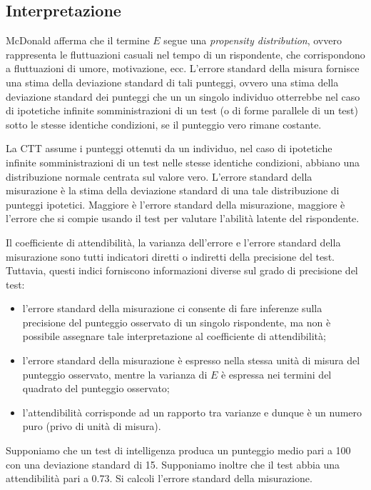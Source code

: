 \documentclass[
  11pt,
]{krantz}
\providecommand{\tightlist}{%
  \setlength{\itemsep}{0pt}\setlength{\parskip}{0pt}}
\theoremstyle{definition}
\theoremstyle{definition}
\theoremstyle{definition}
\theoremstyle{definition}
\theoremstyle{remark}
\begin{document}
\hypertarget{interpretazione}{%
\subsection{Interpretazione}\label{interpretazione}}

McDonald afferma che il termine \(E\) segue una \emph{propensity distribution}, ovvero rappresenta le fluttuazioni casuali nel tempo di un rispondente, che corrispondono a fluttuazioni di umore, motivazione, ecc. L'errore standard della misura fornisce una stima della deviazione standard di tali punteggi, ovvero una stima della deviazione standard dei punteggi che un un singolo individuo otterrebbe nel caso di ipotetiche infinite somministrazioni di un test (o di forme parallele di un test) sotto le stesse identiche condizioni, se il punteggio vero rimane costante.

La CTT assume i punteggi ottenuti da un individuo, nel caso di ipotetiche infinite somministrazioni di un test nelle stesse identiche condizioni, abbiano una distribuzione normale centrata sul valore vero. L'errore standard della misurazione è la stima della deviazione standard di una tale distribuzione di punteggi ipotetici. Maggiore è l'errore standard della misurazione, maggiore è l'errore che si compie usando il test per valutare l'abilità latente del rispondente.

Il coefficiente di attendibilità, la varianza dell'errore e l'errore standard della misurazione sono tutti indicatori diretti o indiretti della precisione del test. Tuttavia, questi indici forniscono informazioni diverse sul grado di precisione del test:

\begin{itemize}
\tightlist
\item
  l'errore standard della misurazione ci consente di fare inferenze sulla precisione del punteggio osservato di un singolo rispondente, ma non è possibile assegnare tale interpretazione al coefficiente di attendibilità;
\item
  l'errore standard della misurazione è espresso nella stessa unità di misura del punteggio osservato, mentre la varianza di \(E\) è espressa nei termini del quadrato del punteggio osservato;
\item
  l'attendibilità corrisponde ad un rapporto tra varianze e dunque è un numero puro (privo di unità di misura).
\end{itemize}

Supponiamo che un test di intelligenza produca un punteggio medio pari a 100 con una deviazione standard di 15. Supponiamo inoltre che il test abbia una attendibilità pari a 0.73. Si calcoli l'errore standard della misurazione.
\end{document}
